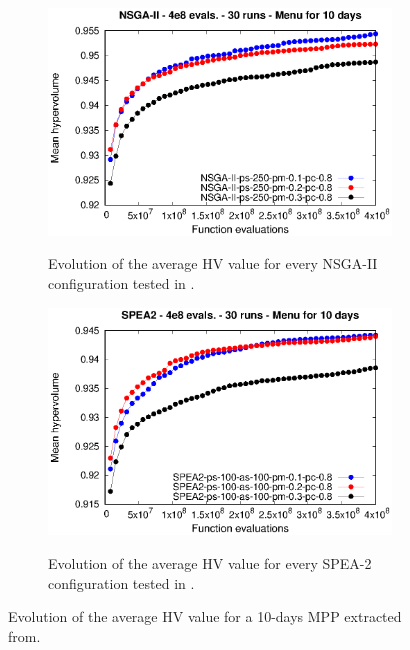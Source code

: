 \begin{figure}[H]
\begin{subfigure}{.5\textwidth}
  \centering
  \includegraphics[width=1.0\linewidth]{../references/meanHV_Evolution_NSGA2_days_10.eps}
  \label{fig:sfig1}
    \caption{Evolution of the average HV value for every NSGA-II configuration tested in \cite{Miranda2018}.}
\end{subfigure}%
\begin{subfigure}{.5\textwidth}
  \centering
  \includegraphics[width=1.0\linewidth]{../references/meanHV_Evolution_SPEA2_days_10.eps}
  \label{fig:sfig2}
  \caption{Evolution of the average HV value for every SPEA-2 configuration tested in \cite{Miranda2018}.}
\end{subfigure}
\caption{Evolution of the average HV value for a 10-days MPP extracted from\cite{Miranda2018}.}
\label{fig:previous_HV_10}
\end{figure}
